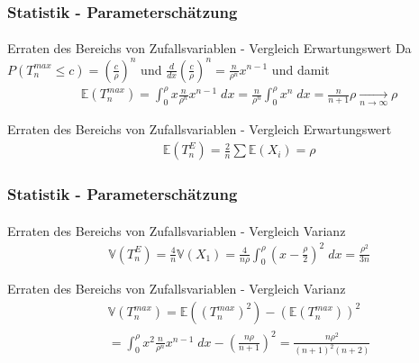 \documentclass{beamer}
\begin{document}
\begin{frame}
    \frametitle{Statistik - Parameterschätzung}
\framesubtitle{}


\begin{block}{Erraten des Bereichs von Zufallsvariablen - Vergleich Erwartungswert}
Da $P( T_n^{max}  \leq c) = (\frac{c}{\rho})^n $ und  $\frac{d}{dx} (\frac{c}{\rho})^n = \frac{n}{\rho^n} x^{n-1} $ und damit
\begin{align*}
& \mathbb{E}(T_n^{max} ) = \int_{0}^{\rho} x \frac{n}{\rho^n} x^{n- 1} \; dx  = \frac{n}{\rho^n} \int_{0}^{\rho} x^n \; dx = \frac{n}{n+1} \rho    \underset{n \to \infty}{\longrightarrow} \rho
\end{align*}
\end{block}

\begin{block}{Erraten des Bereichs von Zufallsvariablen - Vergleich Erwartungswert}
\begin{align*}
& \mathbb{E}(T_n^{E} ) = \frac{2}{n} \sum \mathbb{E}(X_i)   = \rho
\end{align*}
\end{block}
 \end{frame}




\begin{frame}
    \frametitle{Statistik - Parameterschätzung}
\framesubtitle{}

\begin{block}{Erraten des Bereichs von Zufallsvariablen - Vergleich Varianz}
\begin{align*}
& \mathbb{V}(T_n^{E} ) = \frac{4}{n} \mathbb{V}(X_1)   =  \frac{4}{n \rho}   \int_{0}^{\rho } (x - \frac{\rho}{2})^2 \; dx = \frac{\rho^2}{3n}
\end{align*}
\end{block}
\begin{block}{Erraten des Bereichs von Zufallsvariablen - Vergleich Varianz}
\begin{align*}
& \mathbb{V}(T_n^{max} ) = \mathbb{E}((T_n^{max})^2 ) - (\mathbb{E}(T_n^{max} ))^2   \\
& = \int_{0}^{\rho} x^2 \frac{n}{\rho^n} x^{n- 1} \; dx - (\frac{n \rho}{n+1})^2 = \frac{n \rho^2}{(n+1)^2 (n+2)} 
\end{align*}
\end{block}
 \end{frame}




\end{document}
